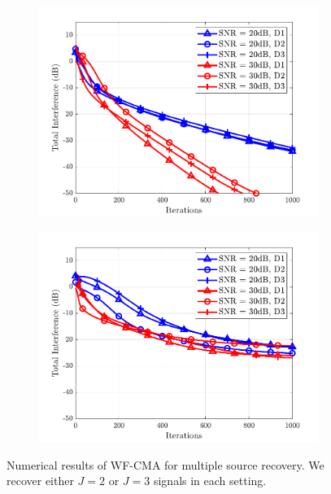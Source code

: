 \begin{figure}
\begin{subfigure}[t]{0.32\textwidth}
		\label{wfcma:fig:wf_msr_success_M16L9}
	\end{subfigure}\hfill
	\begin{subfigure}[t]{0.32\textwidth}
		\includegraphics[width=\linewidth]{./figs/wfcma_figs/BF_WF_MSR_TI_4QAM_L=9_M=16_J=3_K=400_2.pdf}	
		\label{wfcma:fig:wf_msr_4qam_M16L9}
	\end{subfigure}\hfill
	\begin{subfigure}[t]{0.32\textwidth}
		\includegraphics[width=\linewidth]{./figs/wfcma_figs/BF_WF_MSR_TI_16QAM_L=9_M=16_J=3_K=1000_2.pdf}	
		\label{wfcma:fig:wf_msr_16qam_M16L9}
	\end{subfigure}
	\caption[Numerical results of WF-CMA for multiple source recovery.]{Numerical results of WF-CMA for multiple source recovery. We recover either $J=2$ or $J=3$ signals in each setting.}
	\label{wfcma:fig:CMA_WF_msr}
\end{figure}

